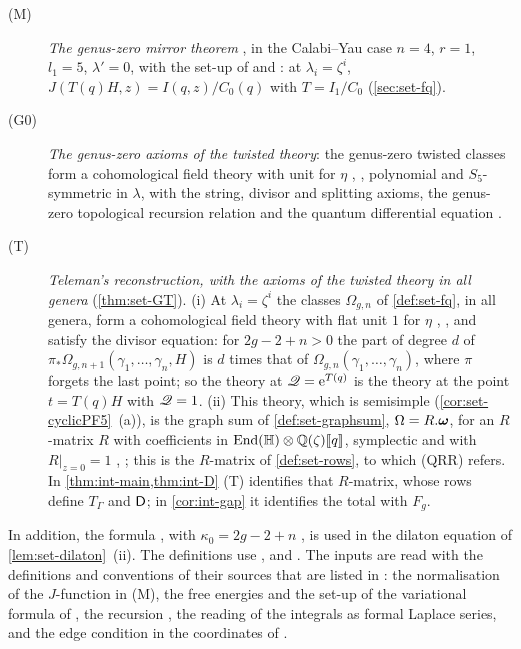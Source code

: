 \begin{description}
\item[(M)] \emph{The genus-zero mirror theorem} \cite[Theorem~11.6]{MR1408320}, in the Calabi--Yau case $n=4$, $r=1$, $l_1=5$, $\lambda'=0$, with the set-up of \cite[\S9]{MR1408320} and \cite[Prop.~11.4]{MR1408320}: at $\lambda_i=\zeta^i$, $J(T(q)H,z)=I(q,z)/C_0(q)$ with $T=I_1/C_0$ (\cref{sec:set-fq}).
\item[(G0)] \emph{The genus-zero axioms of the twisted theory}: the genus-zero twisted classes form a cohomological field theory with unit for $\eta$ \cite[\S4.1]{GJR18}, \cite[Def.~0.3]{PPZ15}, polynomial and $S_5$-symmetric in $\lambda$, with the string, divisor and splitting axioms, the genus-zero topological recursion relation and the quantum differential equation \cite[\S5.2, the display before (14), of which (14) is the form in the $q$-direction]{GJR18}.
\item[(T)] \emph{Teleman's reconstruction, with the axioms of the twisted theory in all genera} (\cref{thm:set-GT}). (i) At $\lambda_i=\zeta^i$ the classes $\Omega_{g,n}$ of \cref{def:set-fq}, in all genera, form a cohomological field theory with flat unit $1$ for $\eta$ \cite[\S4.1]{GJR18}, \cite[Def.~0.3]{PPZ15}, and satisfy the divisor equation: for $2g-2+n>0$ the part of degree $d$ of $\pi_*\Omega_{g,n+1}(\gamma_1,\dots,\gamma_n,H)$ is $d$ times that of $\Omega_{g,n}(\gamma_1,\dots,\gamma_n)$, where $\pi$ forgets the last point; so the theory at $\mathscr{Q}=\mathrm{e}^{T(q)}$ is the theory at the point $t=T(q)H$ with $\mathscr{Q}=1$. (ii) This theory, which is semisimple (\cref{cor:set-cyclicPF5}~(a)), is the graph sum of \cref{def:set-graphsum}, $\Omega=R.\boldsymbol{\omega}$, for an $R$-matrix $R$ with coefficients in $\operatorname{End}(\mathbb{H})\otimes\mathbb{Q}(\zeta)[\![ q ]\!]$, symplectic and with $R|_{z=0}=1$ \cite[Theorem~(2) in (1.15)]{MR2917177}, \cite[\S4.1, Theorem~4.1]{GJR18}; this is the $R$-matrix of \cref{def:set-rows}, to which (QRR) refers. In \cref{thm:int-main,thm:int-D} (T) identifies that $R$-matrix, whose rows define $T_\Gamma$ and $\mathsf{D}$; in \cref{cor:int-gap} it identifies the total with $F_g$.
\end{description}
In addition, the formula \cite[(1.7)]{AC96}, with $\kappa_0=2g-2+n$ \cite[p.~5]{AC96}, is used in the dilaton equation of \cref{lem:set-dilaton}~(ii). The definitions use \cite[\S0.2, (5)]{LP18}, \cite[\S0.2, (5), (10)]{LP20} and \cite{MR1666787}. The inputs are read with the definitions and conventions of their sources that are listed in : the normalisation of the $J$-function in (M), the free energies and the set-up of the variational formula of \cite{Eynard:2007kz}, the recursion \cite[(2-26)--(2-29)]{Dunin-Barkowski:2015caa}, the reading of the integrals \cite[(2-31), (2-32)]{Dunin-Barkowski:2015caa} as formal Laplace series, and the edge condition \cite[(4-1)]{DuninBarkowski:2012bw} in the coordinates of \cite[\S2.6]{Dunin-Barkowski:2015caa}.

